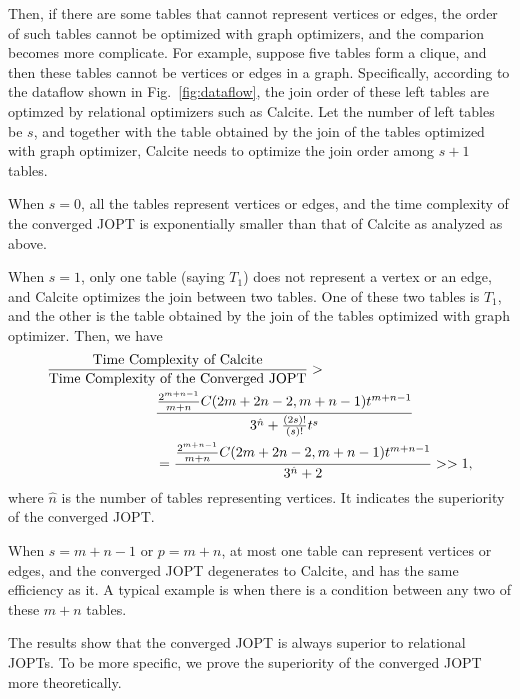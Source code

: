 \documentclass[sigconf, nonacm]{acmart}
\begin{document}
Then, if there are some tables that cannot represent vertices or edges, the order of such tables cannot be optimized with graph optimizers, and the comparion becomes more complicate.
For example, suppose five tables form a clique, and then these tables cannot be vertices or edges in a graph.
Specifically, according to the dataflow shown in Fig.~\ref{fig:dataflow}, the join order of these left tables are optimzed by relational optimizers such as Calcite.
Let the number of left tables be $s$, and together with the table obtained by the join of the tables optimized with graph optimizer, Calcite needs to optimize the join order among $s + 1$ tables.

When $s = 0$, all the tables represent vertices or edges, and the time complexity of the converged JOPT is exponentially smaller than that of Calcite as analyzed as above.

When $s = 1$, only one table (saying $T_1$) does not represent a vertex or an edge, and Calcite optimizes the join between two tables.
One of these two tables is $T_1$, and the other is the table obtained by the join of the tables optimized with graph optimizer.
Then, we have
\begin{equation*}
    \begin{split}
        \frac{\text{Time Complexity of Calcite}}{\text{Time Complexity of the Converged JOPT}} > \hspace{-12em} & \\
        & \frac{\frac{2^{m+n-1}}{m+n}C(2m+2n-2, m+n-1)t^{m + n - 1}}{3^{\hat{n}} + \frac{(2s)!}{(s)!}t^{s}} \\
        & = \frac{\frac{2^{m+n-1}}{m+n}C(2m+2n-2, m+n-1)t^{m + n - 1}}{3^{\hat{n}} + 2} >> 1,
    \end{split}
\end{equation*}
where $\hat{n}$ is the number of tables representing vertices.
It indicates the superiority of the converged JOPT.

When $s = m + n - 1$ or $p = m + n$, at most one table can represent vertices or edges, and the converged JOPT degenerates to Calcite, and has the same efficiency as it.
A typical example is when there is a condition between any two of these $m + n$ tables.

The results show that the converged JOPT is always superior to relational JOPTs.
To be more specific, we prove the superiority of the converged JOPT more theoretically.
\end{document}
